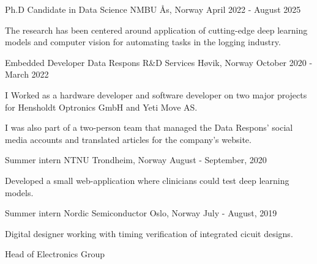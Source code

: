 
\begin{cventries}
    \cventryYJS
        {Ph.D Candidate in Data Science}
        {NMBU}
        {Ås, Norway}
        {April 2022 - August 2025}
        {\begin{cvitems}
            \item {The research has been centered around application of cutting-edge deep learning models and computer vision for automating tasks in the logging industry.}
        \end{cvitems}}
    \cventryYJS
        {Embedded Developer}
        {Data Respons R\&D Services}
        {Høvik, Norway}
        {October 2020 - March 2022}
        {
        \begin{cvitems}
            \item {I Worked as a hardware developer and software developer on two major projects for Hensholdt Optronics GmbH and Yeti Move AS.}
            \item {I was also part of a two-person team that managed the Data Respons' social media accounts and translated articles for the company's website.}
        \end{cvitems}
        }
    \cventryYJS
        {Summer intern}
        {NTNU}
        {Trondheim, Norway}
        {August - September, 2020}
        {\begin{cvitems}
            \item {Developed a small web-application where clinicians could test deep learning models.}
        \end{cvitems}}
    \cventryYJS
        {Summer intern}
        {Nordic Semiconductor}
        {Oslo, Norway}
        {July - August, 2019}
        {
        \begin{cvitems}
            \item {Digital designer working with timing verification of integrated cicuit designs.}
        \end{cvitems}
        }
    \cventryYJS
        {Head of Electronics Group}

\end{cventries}
